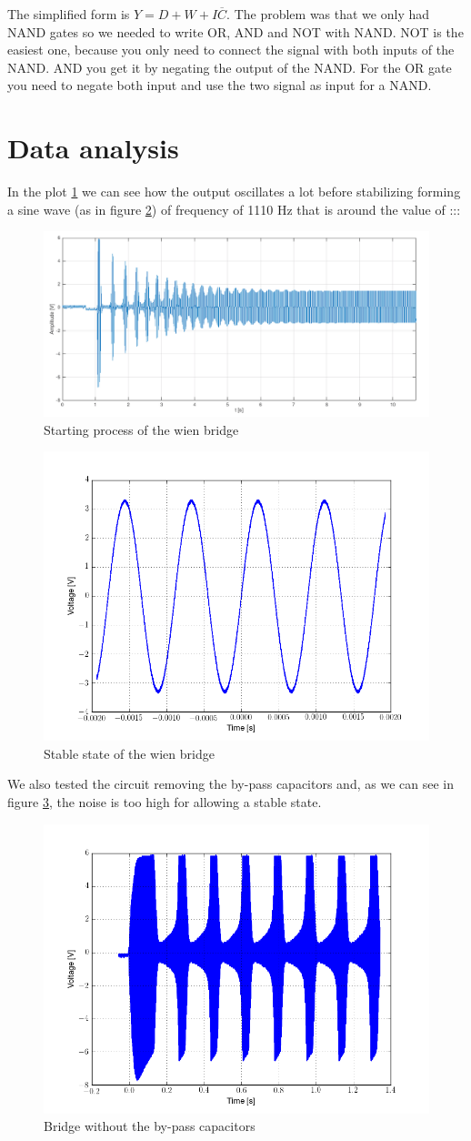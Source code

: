 The simplified form is $Y = D + W + I\overline{C}$. The problem was that we only had NAND gates so we needed to write OR, AND and NOT with NAND. NOT is the easiest one, because you only need to connect the signal with both inputs of the NAND. AND you get it by negating the output of the NAND. For the OR gate you need to negate both input and use the two signal as input  for a NAND.


\section{Data analysis}
In the plot \ref{starting} we can see how the output oscillates a lot before stabilizing forming a sine wave (as in figure \ref{stable}) of frequency of 1110 Hz that is around the value of :::


\begin{figure}[H]
\centering
\includegraphics[width=.7\textwidth]{9/starting.png}
\caption{Starting process of the wien bridge}\label{starting}
\end{figure}

\begin{figure}[H]
\centering
\includegraphics[width=.7\textwidth]{9/stable.png}
\caption{Stable state of the wien bridge}\label{stable}
\end{figure}

We also tested the circuit removing the by-pass capacitors and, as we can see in figure \ref{without_bypass}, the noise is too high for allowing a stable state.

\begin{figure}[H]
\centering
\includegraphics[width=.7\textwidth]{9/without_bypass.png}
\caption{Bridge without the by-pass capacitors}\label{without_bypass}
\end{figure}